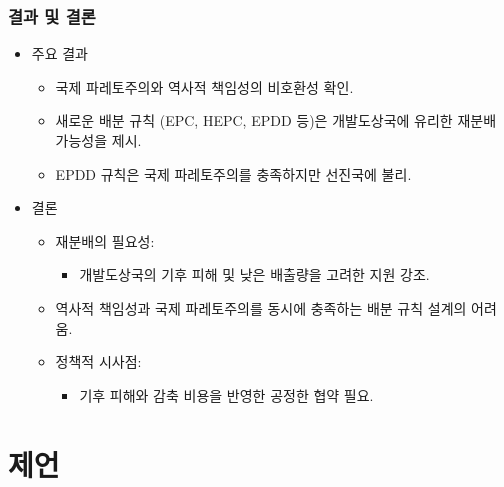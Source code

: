 \documentclass[aspectratio=169,xcolor=dvipsnames,handout]{beamer}
\begin{document}
\begin{frame}
    \frametitle{결과 및 결론}
    \begin{itemize}[<+->]
        \item 주요 결과
        \begin{itemize}
            \item 국제 파레토주의와 역사적 책임성의 비호환성 확인.
            \item 새로운 배분 규칙 (EPC, HEPC, EPDD 등)은 개발도상국에 유리한 재분배 가능성을 제시.
            \item EPDD 규칙은 국제 파레토주의를 충족하지만 선진국에 불리.
        \end{itemize}
        \item 결론
        \begin{itemize}
            \item 재분배의 필요성:
            \begin{itemize}
                \item 개발도상국의 기후 피해 및 낮은 배출량을 고려한 지원 강조.
            \end{itemize}
            \item 역사적 책임성과 국제 파레토주의를 동시에 충족하는 배분 규칙 설계의 어려움.
            \item 정책적 시사점:
            \begin{itemize}
                \item 기후 피해와 감축 비용을 반영한 공정한 협약 필요.
            \end{itemize}
        \end{itemize}
    \end{itemize}
\end{frame}

\section{제언}%
\end{document}
